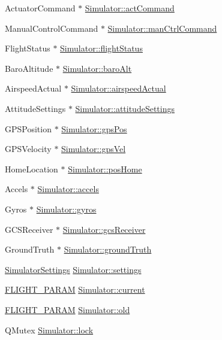\begin{DoxyCompactItemize}
\item 
\-Actuator\-Command $\ast$ \hyperlink{group___h_i_t_l_plugin_ga9362d7e2619934460d6f8070496d336f}{\-Simulator\-::act\-Command}
\item 
\-Manual\-Control\-Command $\ast$ \hyperlink{group___h_i_t_l_plugin_ga1af06e35c7befb4f3ffd0bfee9a6efc2}{\-Simulator\-::man\-Ctrl\-Command}
\item 
\-Flight\-Status $\ast$ \hyperlink{group___h_i_t_l_plugin_ga2c3a29dc6471574d7182db7691e69a56}{\-Simulator\-::flight\-Status}
\item 
\-Baro\-Altitude $\ast$ \hyperlink{group___h_i_t_l_plugin_ga107f3bf3d4cc0c45cc8677742d4445eb}{\-Simulator\-::baro\-Alt}
\item 
\-Airspeed\-Actual $\ast$ \hyperlink{group___h_i_t_l_plugin_gadba0d3a66c5a15e0027b7d95fc9498b4}{\-Simulator\-::airspeed\-Actual}
\item 
\-Attitude\-Settings $\ast$ \hyperlink{group___h_i_t_l_plugin_ga4430b724d2151ce662d6b82a3b8ba74a}{\-Simulator\-::attitude\-Settings}
\item 
\-G\-P\-S\-Position $\ast$ \hyperlink{group___h_i_t_l_plugin_gae4d6ea654494f0de351686d9c35037ca}{\-Simulator\-::gps\-Pos}
\item 
\-G\-P\-S\-Velocity $\ast$ \hyperlink{group___h_i_t_l_plugin_ga649eab8811fb3f1e6596e48eac2d47c7}{\-Simulator\-::gps\-Vel}
\item 
\-Home\-Location $\ast$ \hyperlink{group___h_i_t_l_plugin_ga9fcd56565e3cb4d64bc0c71c0a6151c1}{\-Simulator\-::pos\-Home}
\item 
\-Accels $\ast$ \hyperlink{group___h_i_t_l_plugin_ga35cb24cdab1cfc0d1720b5b58fd0254f}{\-Simulator\-::accels}
\item 
\-Gyros $\ast$ \hyperlink{group___h_i_t_l_plugin_ga0f9daef3b0fe0731e035f2bff3d9df19}{\-Simulator\-::gyros}
\item 
\-G\-C\-S\-Receiver $\ast$ \hyperlink{group___h_i_t_l_plugin_gac63d17091bc4377e1b49696355a0ae19}{\-Simulator\-::gcs\-Receiver}
\item 
\-Ground\-Truth $\ast$ \hyperlink{group___h_i_t_l_plugin_ga6c62059f6d424f96ad1142bfe8885e3a}{\-Simulator\-::ground\-Truth}
\item 
\hyperlink{group___h_i_t_l_plugin_ga052199f1328d3002bce3e45345aa7f4e}{\-Simulator\-Settings} \hyperlink{group___h_i_t_l_plugin_ga61775246e91fbe43ce9d79c03bfde19f}{\-Simulator\-::settings}
\item 
\hyperlink{group___h_i_t_l_plugin_ga7bda7a22b899fe8dff0ba9a0cae99da6}{\-F\-L\-I\-G\-H\-T\-\_\-\-P\-A\-R\-A\-M} \hyperlink{group___h_i_t_l_plugin_gaa4ad7484ddab07936a31a63fab4be22e}{\-Simulator\-::current}
\item 
\hyperlink{group___h_i_t_l_plugin_ga7bda7a22b899fe8dff0ba9a0cae99da6}{\-F\-L\-I\-G\-H\-T\-\_\-\-P\-A\-R\-A\-M} \hyperlink{group___h_i_t_l_plugin_gadb185afa7e72d63655cb097e1c1d8200}{\-Simulator\-::old}
\item 
\-Q\-Mutex \hyperlink{group___h_i_t_l_plugin_ga807f372f1fd1876041ae159adca0514b}{\-Simulator\-::lock}
\end{DoxyCompactItemize}
